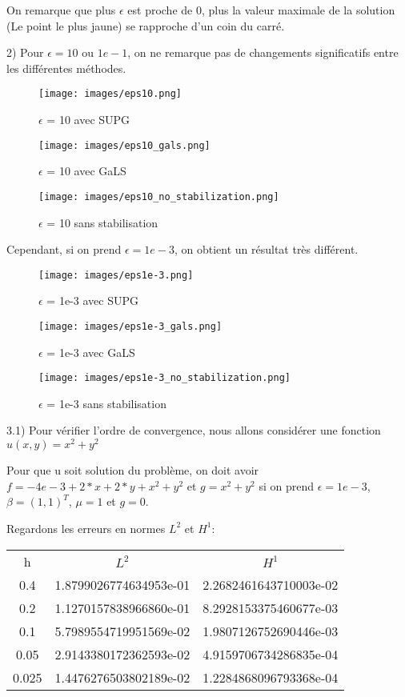 \documentclass{article}
\begin{document}
On remarque que plus $\epsilon$ est proche de 0, plus la valeur maximale de la solution (Le point le plus jaune) se rapproche d'un coin du carré.

2) Pour $\epsilon = 10$ ou $1e-1$, on ne remarque pas de changements significatifs entre les différentes méthodes.

\begin{figure}
    \centering
    \texttt{[image: images/eps10.png]}
    \caption{$\epsilon$ = 10 avec SUPG}
\end{figure}
\begin{figure}
    \centering
    \texttt{[image: images/eps10\_gals.png]}
    \caption{$\epsilon$ = 10 avec GaLS}
\end{figure}  
\begin{figure}
    \centering
    \texttt{[image: images/eps10\_no\_stabilization.png]}
    \caption{$\epsilon$ = 10 sans stabilisation}
\end{figure}

Cependant, si on prend $\epsilon = 1e-3$, on obtient un résultat très différent.

\begin{figure}
    \centering
    \texttt{[image: images/eps1e-3.png]}
    \caption{$\epsilon$ = 1e-3 avec SUPG}
\end{figure}
\begin{figure}
    \centering
    \texttt{[image: images/eps1e-3\_gals.png]}
    \caption{$\epsilon$ = 1e-3 avec GaLS}
\end{figure}  
\begin{figure}
    \centering
    \texttt{[image: images/eps1e-3\_no\_stabilization.png]}
    \caption{$\epsilon$ = 1e-3 sans stabilisation}
\end{figure}

3.1) Pour vérifier l'ordre de convergence, nous allons considérer une fonction $u(x,y) = x^2+y^2$

Pour que u soit solution du problème, on doit avoir $f = -4e-3+2*x+2*y+x^2+y^2$ et $g = x^2+y^2$ si on prend $\epsilon = 1e-3$, $\beta = (1,1)^T$, $\mu = 1$ et $g=0$.

Regardons les erreurs en normes $L^2$ et $H^1$:

\begin{tabular}{c|c|c}
    h & $L^2$ & $H^1$ \\
    0.4   &  1.8799026774634953e-01 &  2.2682461643710003e-02 \\
    0.2   &  1.1270157838966860e-01 &  8.2928153375460677e-03 \\
    0.1   &  5.7989554719951569e-02 &  1.9807126752690446e-03 \\
    0.05  &  2.9143380172362593e-02 &  4.9159706734286835e-04 \\
    0.025 &  1.4476276503802189e-02 & 1.2284868096793368e-04
\end{tabular}
\end{document}
